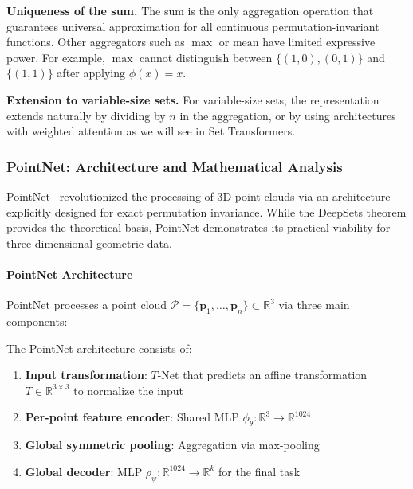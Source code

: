 \textbf{Uniqueness of the sum.}\label{rem:uniqueness_sum} The sum is the only aggregation operation that guarantees universal approximation for all continuous permutation-invariant functions. Other aggregators such as $\max$ or $\text{mean}$ have limited expressive power. For example, $\max$ cannot distinguish between $\{(1,0), (0,1)\}$ and $\{(1,1)\}$ after applying $\phi(x) = x$.

\textbf{Extension to variable-size sets.} For variable-size sets, the representation extends naturally by dividing by $n$ in the aggregation, or by using architectures with weighted attention as we will see in Set Transformers.

\subsubsection{PointNet: Architecture and Mathematical Analysis}

PointNet~\citep{qi2017pointnet} revolutionized the processing of 3D point clouds via an architecture explicitly designed for exact permutation invariance. While the DeepSets theorem provides the theoretical basis, PointNet demonstrates its practical viability for three-dimensional geometric data.

\paragraph{PointNet Architecture}

PointNet processes a point cloud $\mathcal{P} = \{\mathbf{p}_1, \ldots, \mathbf{p}_n\} \subset \mathbb{R}^3$ via three main components:

\begin{definition}\label{def:pointnet_architecture}
The PointNet architecture consists of:
\begin{enumerate}
    \item \textbf{Input transformation}: $T$-Net that predicts an affine transformation $T \in \mathbb{R}^{3 \times 3}$ to normalize the input
    \item \textbf{Per-point feature encoder}: Shared MLP $\phi_\theta: \mathbb{R}^3 \to \mathbb{R}^{1024}$
    \item \textbf{Global symmetric pooling}: Aggregation via max-pooling
    \item \textbf{Global decoder}: MLP $\rho_\psi: \mathbb{R}^{1024} \to \mathbb{R}^k$ for the final task
\end{enumerate}
\end{definition}

